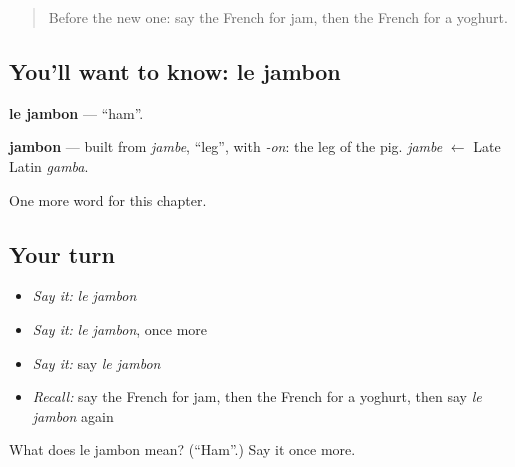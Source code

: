 \label{lesson:FR-C71-jambon}



\begin{quote}
Before the new one: say the French for jam, then the French for a yoghurt.
\end{quote}

\subsection*{You'll want to know: le jambon}
\textbf{le jambon} — \textquotedblleft{}ham\textquotedblright{}.

\begin{cousinweb}
\textbf{jambon} — built from \emph{jambe}, \textquotedblleft{}leg\textquotedblright{}, with \emph{-on}: the leg of the pig. \emph{jambe} $\leftarrow$ Late Latin \emph{gamba}.
\end{cousinweb}

\begin{grammarlens}[title={What you've built}]
One more word for this chapter.
\end{grammarlens}

\subsection*{Your turn}
\begin{itemize}
\raggedright
  \item \emph{Say it:} \emph{le jambon}
  \item \emph{Say it:} \emph{le jambon}, once more
  \item \emph{Say it:} say \emph{le jambon}
  \item \emph{Recall:} say the French for jam, then the French for a yoghurt, then say \emph{le jambon} again
\end{itemize}

\begin{tcolorbox}[breakable,colback=teal!4,colframe=teal!35!black,title={Before you move on}]
What does le jambon mean? (\textquotedblleft{}Ham\textquotedblright{}.) Say it once more.
\end{tcolorbox}
